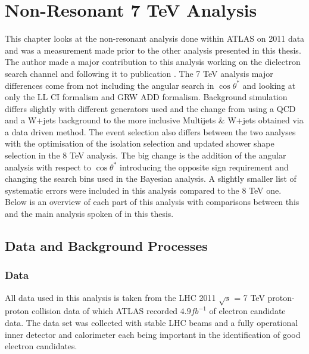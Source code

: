 \chapter{Non-Resonant 7 TeV Analysis}
\label{ch:7tev}

This chapter looks at the non-resonant analysis done within ATLAS on 2011 data and was a measurement made prior to the other analysis presented in this thesis. The author made a major contribution to this analysis working on the dielectron search channel and following it to publication \cite{PhysRevD.87.015010}. 
The 7 TeV analysis major differences come from not including the angular search in $\cos{\theta^{*}}$ and looking at only the LL CI formalism and GRW ADD formalism. 
Background simulation differs slightly with different generators used and the change from using a QCD and a W+jets background to the more inclusive Multijets \& W+jets obtained via a data driven method. The event selection also differs between the two analyses with the optimisation of the isolation selection and updated shower shape selection in the 8 TeV analysis. The big change is the addition of the angular analysis with respect to $\cos\theta^{*}$ introducing the opposite sign requirement and changing the search bins used in the Bayesian analysis. A slightly smaller list of systematic errors were included in this analysis compared to the 8 TeV one.
Below is an overview of each part of this analysis with comparisons between this and the main analysis spoken of in this thesis.






\section{Data and Background Processes}

\subsection*{Data}
	All data used in this analysis is taken from the LHC 2011 $\sqrt{s}$ = 7 TeV proton-proton collision data of which ATLAS recorded $4.9 fb^{-1}$ of electron candidate data. The data set was collected with stable LHC beams and a fully operational inner detector and calorimeter each being important in the identification of good electron candidates.

